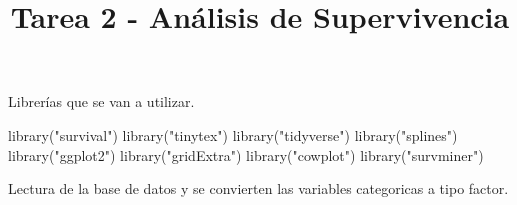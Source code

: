 \documentclass[
]{article}
\title{Tarea 2 - Análisis de Supervivencia}
\author{}
\date{\vspace{-2.5em}}
\newenvironment{Shaded}{\begin{snugshade}}{\end{snugshade}}
\newcommand{\AttributeTok}[1]{\textcolor[rgb]{0.77,0.63,0.00}{#1}}
\newcommand{\FunctionTok}[1]{\textcolor[rgb]{0.00,0.00,0.00}{#1}}
\newcommand{\NormalTok}[1]{#1}
\newcommand{\OtherTok}[1]{\textcolor[rgb]{0.56,0.35,0.01}{#1}}
\newcommand{\SpecialCharTok}[1]{\textcolor[rgb]{0.00,0.00,0.00}{#1}}
\newcommand{\StringTok}[1]{\textcolor[rgb]{0.31,0.60,0.02}{#1}}
\begin{document}
\maketitle

Librerías que se van a utilizar.

\begin{Shaded}
\end{Shaded}

\begin{Shaded}
\begin{Highlighting}[]
\FunctionTok{library}\NormalTok{(}\StringTok{"survival"}\NormalTok{)}
\FunctionTok{library}\NormalTok{(}\StringTok{"tinytex"}\NormalTok{)}
\FunctionTok{library}\NormalTok{(}\StringTok{"tidyverse"}\NormalTok{)}
\FunctionTok{library}\NormalTok{(}\StringTok{"splines"}\NormalTok{)}
\FunctionTok{library}\NormalTok{(}\StringTok{"ggplot2"}\NormalTok{)}
\FunctionTok{library}\NormalTok{(}\StringTok{"gridExtra"}\NormalTok{)}
\FunctionTok{library}\NormalTok{(}\StringTok{"cowplot"}\NormalTok{)}
\FunctionTok{library}\NormalTok{(}\StringTok{"survminer"}\NormalTok{)}
\end{Highlighting}
\end{Shaded}

Lectura de la base de datos y se convierten las variables categoricas a
tipo factor.

\begin{Shaded}
\end{Shaded}
\end{document}
